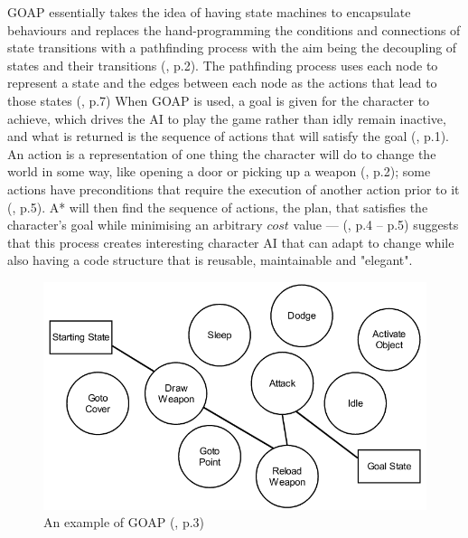 \documentclass[11pt, a4paper]{article}
\begin{document}
GOAP essentially takes the idea of having state machines to encapsulate behaviours and replaces the hand-programming the conditions and connections of state transitions with a pathfinding process with the aim being the decoupling of states and their transitions (\cite{orkin2003applying}, p.2). The pathfinding process uses each node to represent a state and the edges between each node as the actions that lead to those states (\cite{orkin2003applying}, p.7) When GOAP is used, a goal is given for the character to achieve, which drives the AI to play the game rather than idly remain inactive, and what is returned is the sequence of actions that will satisfy the goal (\cite{orkin2003applying}, p.1). An action is a representation of one thing the character will do to change the world in some way, like opening a door or picking up a weapon (\cite{orkin2003applying}, p.2); some actions have preconditions that require the execution of another action prior to it (\cite{orkin2003applying}, p.5). A* will then find the sequence of actions, the plan, that satisfies the character's goal while minimising an arbitrary $cost$ value --- \citeauthor{orkin2003applying} (\citeyear{orkin2003applying}, p.4 -- p.5) suggests that this process creates interesting character AI that can adapt to change while also having a code structure that is reusable, maintainable and "elegant".

\begin{figure}[h]
  \includegraphics[width=\linewidth]{img/goap_figure_1.png}
  \caption{An example of GOAP (\cite{orkin2003applying}, p.3)}
  \label{fig:goap}
\end{figure}
\end{document}
